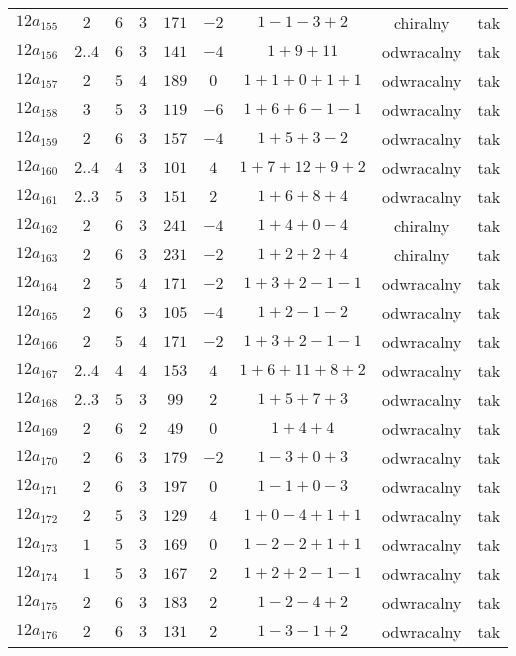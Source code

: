 \begin{longtable}{ccccccccc}
$12a_{155}$ & $2$ & $6$ & $3$ & $171$ & $-2$ & $1-1-3+2$ & chiralny & tak \\
$12a_{156}$ & $2..4$ & $6$ & $3$ & $141$ & $-4$ & $1+9+11$ & odwracalny & tak \\
$12a_{157}$ & $2$ & $5$ & $4$ & $189$ & $0$ & $1+1+0+1+1$ & odwracalny & tak \\
$12a_{158}$ & $3$ & $5$ & $3$ & $119$ & $-6$ & $1+6+6-1-1$ & odwracalny & tak \\
$12a_{159}$ & $2$ & $6$ & $3$ & $157$ & $-4$ & $1+5+3-2$ & odwracalny & tak \\
$12a_{160}$ & $2..4$ & $4$ & $3$ & $101$ & $4$ & $1+7+12+9+2$ & odwracalny & tak \\
$12a_{161}$ & $2..3$ & $5$ & $3$ & $151$ & $2$ & $1+6+8+4$ & odwracalny & tak \\
$12a_{162}$ & $2$ & $6$ & $3$ & $241$ & $-4$ & $1+4+0-4$ & chiralny & tak \\
$12a_{163}$ & $2$ & $6$ & $3$ & $231$ & $-2$ & $1+2+2+4$ & chiralny & tak \\
$12a_{164}$ & $2$ & $5$ & $4$ & $171$ & $-2$ & $1+3+2-1-1$ & odwracalny & tak \\
$12a_{165}$ & $2$ & $6$ & $3$ & $105$ & $-4$ & $1+2-1-2$ & odwracalny & tak \\
$12a_{166}$ & $2$ & $5$ & $4$ & $171$ & $-2$ & $1+3+2-1-1$ & odwracalny & tak \\
$12a_{167}$ & $2..4$ & $4$ & $4$ & $153$ & $4$ & $1+6+11+8+2$ & odwracalny & tak \\
$12a_{168}$ & $2..3$ & $5$ & $3$ & $99$ & $2$ & $1+5+7+3$ & odwracalny & tak \\
$12a_{169}$ & $2$ & $6$ & $2$ & $49$ & $0$ & $1+4+4$ & odwracalny & tak \\
$12a_{170}$ & $2$ & $6$ & $3$ & $179$ & $-2$ & $1-3+0+3$ & odwracalny & tak \\
$12a_{171}$ & $2$ & $6$ & $3$ & $197$ & $0$ & $1-1+0-3$ & odwracalny & tak \\
$12a_{172}$ & $2$ & $5$ & $3$ & $129$ & $4$ & $1+0-4+1+1$ & odwracalny & tak \\
$12a_{173}$ & $1$ & $5$ & $3$ & $169$ & $0$ & $1-2-2+1+1$ & odwracalny & tak \\
$12a_{174}$ & $1$ & $5$ & $3$ & $167$ & $2$ & $1+2+2-1-1$ & odwracalny & tak \\
$12a_{175}$ & $2$ & $6$ & $3$ & $183$ & $2$ & $1-2-4+2$ & odwracalny & tak \\
$12a_{176}$ & $2$ & $6$ & $3$ & $131$ & $2$ & $1-3-1+2$ & odwracalny & tak \\

\end{longtable}
